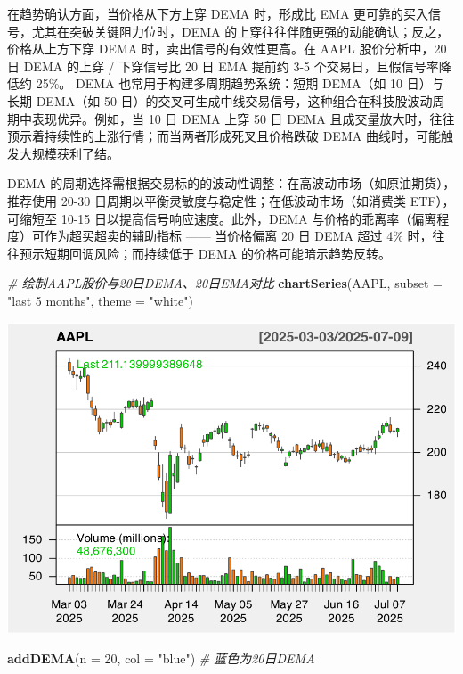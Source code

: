 \documentclass[]{ctexbook}
\newenvironment{Shaded}{\begin{snugshade}}{\end{snugshade}}
\newcommand{\AttributeTok}[1]{\textcolor[rgb]{0.13,0.29,0.53}{#1}}
\newcommand{\CommentTok}[1]{\textcolor[rgb]{0.56,0.35,0.01}{\textit{#1}}}
\newcommand{\DecValTok}[1]{\textcolor[rgb]{0.00,0.00,0.81}{#1}}
\newcommand{\FunctionTok}[1]{\textcolor[rgb]{0.13,0.29,0.53}{\textbf{#1}}}
\newcommand{\NormalTok}[1]{#1}
\newcommand{\StringTok}[1]{\textcolor[rgb]{0.31,0.60,0.02}{#1}}
\begin{document}
在趋势确认方面，当价格从下方上穿 DEMA 时，形成比 EMA 更可靠的买入信号，尤其在突破关键阻力位时，DEMA 的上穿往往伴随更强的动能确认；反之，价格从上方下穿 DEMA 时，卖出信号的有效性更高。在 AAPL 股价分析中，20 日 DEMA 的上穿 / 下穿信号比 20 日 EMA 提前约 3-5 个交易日，且假信号率降低约 25\%。
DEMA 也常用于构建多周期趋势系统：短期 DEMA（如 10 日）与长期 DEMA（如 50 日）的交叉可生成中线交易信号，这种组合在科技股波动周期中表现优异。例如，当 10 日 DEMA 上穿 50 日 DEMA 且成交量放大时，往往预示着持续性的上涨行情；而当两者形成死叉且价格跌破 DEMA 曲线时，可能触发大规模获利了结。

DEMA 的周期选择需根据交易标的的波动性调整：在高波动市场（如原油期货），推荐使用 20-30 日周期以平衡灵敏度与稳定性；在低波动市场（如消费类 ETF），可缩短至 10-15 日以提高信号响应速度。此外，DEMA 与价格的乖离率（偏离程度）可作为超买超卖的辅助指标 ------ 当价格偏离 20 日 DEMA 超过 4\% 时，往往预示短期回调风险；而持续低于 DEMA 的价格可能暗示趋势反转。

\begin{Shaded}
\begin{Highlighting}[]
\CommentTok{\# 绘制AAPL股价与20日DEMA、20日EMA对比}
\FunctionTok{chartSeries}\NormalTok{(AAPL, }\AttributeTok{subset =} \StringTok{"last 5 months"}\NormalTok{, }\AttributeTok{theme =} \StringTok{"white"}\NormalTok{)}
\end{Highlighting}
\end{Shaded}

\includegraphics[width=0.9\linewidth]{quantmod_files/figure-latex/dema-1}

\begin{Shaded}
\begin{Highlighting}[]
\FunctionTok{addDEMA}\NormalTok{(}\AttributeTok{n =} \DecValTok{20}\NormalTok{, }\AttributeTok{col =} \StringTok{"blue"}\NormalTok{)    }\CommentTok{\# 蓝色为20日DEMA}
\end{Highlighting}
\end{Shaded}
\end{document}
